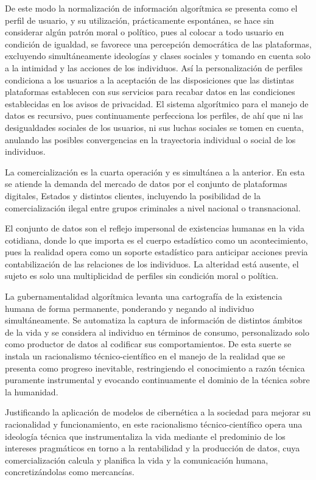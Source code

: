 \documentclass[
  spanish,
  11pt,
  a4paper,
]{scrbook}
\begin{document}
De este modo la normalización de información algorítmica se presenta
como el perfil de usuario, y su utilización, prácticamente espontánea,
se hace sin considerar algún patrón moral o político, pues al colocar a
todo usuario en condición de igualdad, se favorece una percepción
democrática de las plataformas, excluyendo simultáneamente ideologías y
clases sociales y tomando en cuenta solo a la intimidad y las acciones
de los individuos. Así la personalización de perfiles condiciona a los
usuarios a la aceptación de las disposiciones que las distintas
plataformas establecen con sus servicios para recabar datos en las
condiciones establecidas en los avisos de privacidad. El sistema
algorítmico para el manejo de datos es recursivo, pues continuamente
perfecciona los perfiles, de ahí que ni las desigualdades sociales de
los usuarios, ni sus luchas sociales se tomen en cuenta, anulando las
posibles convergencias en la trayectoria individual o social de los
individuos.

La comercialización es la cuarta operación y es simultánea a la
anterior. En esta se atiende la demanda del mercado de datos por el
conjunto de plataformas digitales, Estados y distintos clientes,
incluyendo la posibilidad de la comercialización ilegal entre grupos
criminales a nivel nacional o transnacional.

El conjunto de datos son el reflejo impersonal de existencias humanas en
la vida cotidiana, donde lo que importa es el cuerpo estadístico como un
acontecimiento, pues la realidad opera como un soporte estadístico para
anticipar acciones previa contabilización de las relaciones de los
individuos. La alteridad está ausente, el sujeto es solo una
multiplicidad de perfiles sin condición moral o política.

La gubernamentalidad algorítmica levanta una cartografía de la
existencia humana de forma permanente, ponderando y negando al individuo
simultáneamente. Se automatiza la captura de información de distintos
ámbitos de la vida y se considera al individuo en términos de consumo,
personalizado solo como productor de datos al codificar sus
comportamientos. De esta suerte se instala un racionalismo
técnico-científico en el manejo de la realidad que se presenta como
progreso inevitable, restringiendo el conocimiento a razón técnica
puramente instrumental y evocando continuamente el dominio de la técnica
sobre la humanidad.

Justificando la aplicación de modelos de cibernética a la sociedad para
mejorar su racionalidad y funcionamiento, en este racionalismo
técnico-científico opera una ideología técnica que instrumentaliza la
vida mediante el predominio de los intereses pragmáticos en torno a la
rentabilidad y la producción de datos, cuya comercialización calcula y
planifica la vida y la comunicación humana, concretizándolas como
mercancías.
\end{document}
